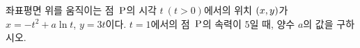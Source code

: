 좌표평면 위를 움직이는 점~$\mathrm{P}$의 시각 $t\ (t>0)$에서의 위치 $(x{,}\mkern3mu\mathopen{}y)$가 $x=-t^2+a\ln t$, $y=3t$이다. $t=1$에서의 점~$\mathrm{P}$의 속력이 $5$일 때, 양수 $a$의 값을 구하시오.
